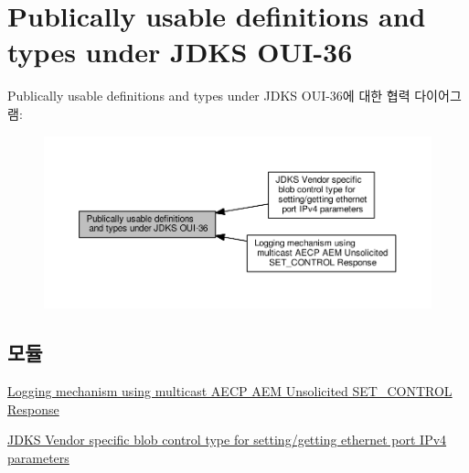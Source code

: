 \hypertarget{group__jdks}{}\section{Publically usable definitions and types under J\+D\+KS O\+U\+I-\/36}
\label{group__jdks}
Publically usable definitions and types under J\+D\+KS O\+U\+I-\/36에 대한 협력 다이어그램\+:
\nopagebreak
\begin{figure}[H]
\begin{center}
\leavevmode
\includegraphics[width=350pt]{group__jdks}
\end{center}
\end{figure}
\subsection*{모듈}
\begin{DoxyCompactItemize}
\item 
\hyperlink{group__jdks__log}{Logging mechanism using multicast A\+E\+C\+P A\+E\+M Unsolicited S\+E\+T\+\_\+\+C\+O\+N\+T\+R\+O\+L Response}
\item 
\hyperlink{group__jdks__ipv4}{J\+D\+K\+S Vendor specific blob control type for setting/getting ethernet port I\+Pv4 parameters}
\end{DoxyCompactItemize}
